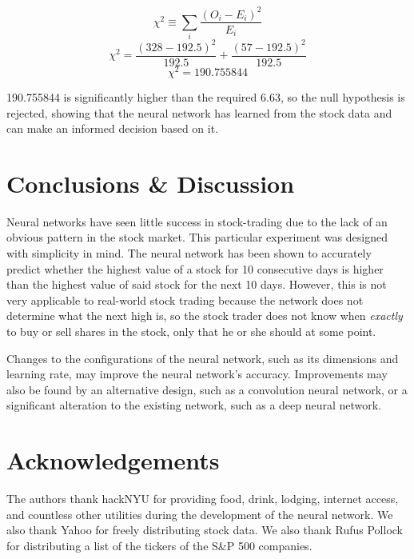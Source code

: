 \documentclass[twocolumn]{article}
\begin{document}
$$\chi^2 \equiv \sum_{i} \frac{(O_i - E_i)^2}{E_i}$$
$$\chi^2 = \frac{(328 - 192.5)^2}{192.5} + \frac{(57 - 192.5)^2}{192.5}$$
$$\chi^2 = 190.755844$$

190.755844 is significantly higher than the required 6.63, so the null hypothesis is rejected, showing that the neural network has learned from the stock data and can make an informed decision based on it.

\section{Conclusions \& Discussion}
Neural networks have seen little success in stock-trading due to the lack of an obvious pattern in the stock market. This particular experiment was designed with simplicity in mind. The neural network has been shown to accurately predict whether the highest value of a stock for 10 consecutive days is higher than the highest value of said stock for the next 10 days. However, this is not very applicable to real-world stock trading because the network does not determine what the next high is, so the stock trader does not know when \textit{exactly} to buy or sell shares in the stock, only that he or she should at some point.

Changes to the configurations of the neural network, such as its dimensions and learning rate, may improve the neural network's accuracy. Improvements may also be found by an alternative design, such as a convolution neural network, or a significant alteration to the existing network, such as a deep neural network.

\section{Acknowledgements}
The authors thank hackNYU for providing food, drink, lodging, internet access, and countless other utilities during the development of the neural network. We also thank Yahoo for freely distributing stock data. We also thank Rufus Pollock for distributing a list of the tickers of the S\&P 500 companies.


\end{document}
